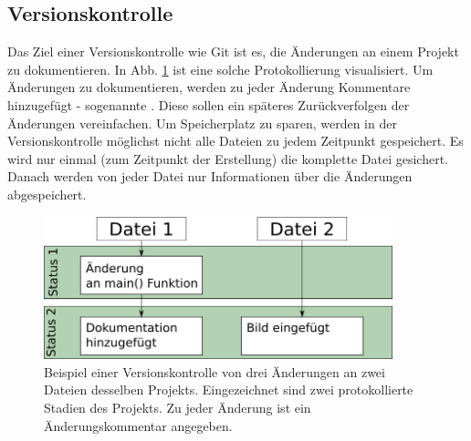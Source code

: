 \subsection{Versionskontrolle}
Das Ziel einer Versionskontrolle wie Git ist es, die Änderungen an einem Projekt zu dokumentieren. In Abb. \ref{fig:vers-kontrol}
ist eine solche Protokollierung visualisiert. Um Änderungen zu dokumentieren, werden zu jeder Änderung Kommentare hinzugefügt - sogenannte . Diese sollen ein späteres Zurückverfolgen der Änderungen vereinfachen. Um Speicherplatz zu sparen, werden in der Versionskontrolle möglichst nicht alle Dateien zu jedem Zeitpunkt gespeichert. Es wird nur einmal (zum Zeitpunkt der Erstellung) die komplette Datei gesichert. Danach werden von jeder Datei nur Informationen über die Änderungen abgespeichert.
\begin{figure}[!h]
    \centering
    \includegraphics[width=0.9\textwidth]{Bilder/Versioncontrol.png}
    \caption{Beispiel einer Versionskontrolle von drei Änderungen an zwei Dateien desselben Projekts. Eingezeichnet sind zwei protokollierte Stadien des Projekts. Zu jeder Änderung ist ein Änderungskommentar angegeben.}
    \label{fig:vers-kontrol}
\end{figure}